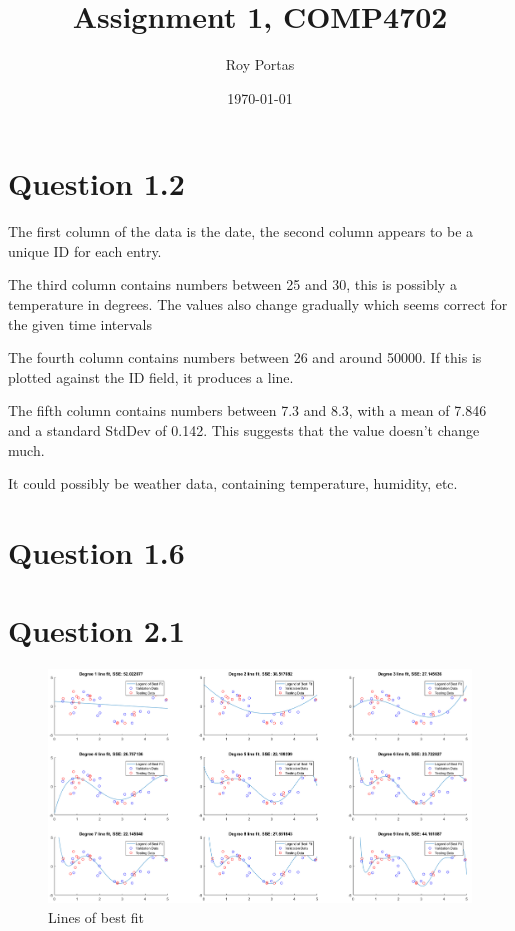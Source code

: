 

\title{Assignment 1, COMP4702}
\author{Roy Portas}
\date{\today}



\begin{titlepage}
    \maketitle
\end{titlepage}

\section*{Question 1.2}

The first column of the data is the date, the second column appears to be a
unique ID for each entry.

The third column contains numbers between 25 and 30, this is possibly a
temperature in degrees. The values also change gradually which seems correct
for the given time intervals

The fourth column contains numbers between 26 and around 50000. If this is
plotted against the ID field, it produces a line.

The fifth column contains numbers between 7.3 and 8.3, with a mean of 7.846 and
a standard StdDev of 0.142. This suggests that the value doesn't change much.

It could possibly be weather data, containing temperature, humidity, etc.

\section*{Question 1.6}



\section*{Question 2.1}

\begin{figure}[H]
    \includegraphics[width=\linewidth]{../../pracs/week3/images/q1_lines_of_best_fit}
    \centering
    \caption{Lines of best fit}
\end{figure}

